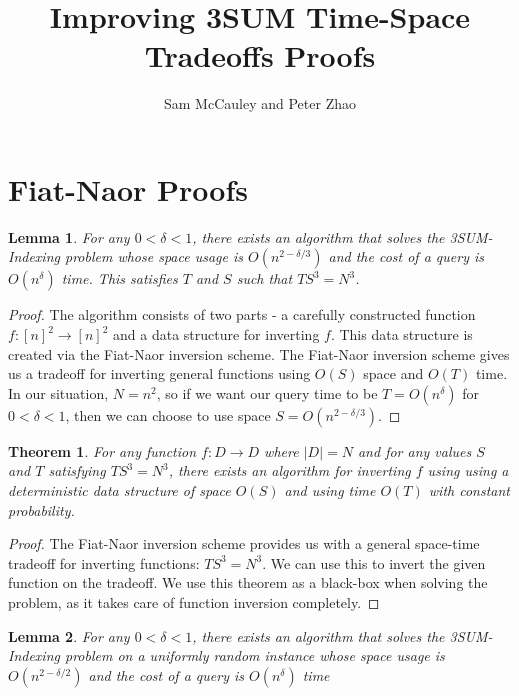 \documentclass{article}
\title{Improving 3SUM Time-Space Tradeoffs Proofs}
\author{Sam McCauley and Peter Zhao}
\date{}
\newtheorem{theorem}{Theorem}
\newtheorem{lemma}{Lemma}
\begin{document}
\maketitle

\section{Fiat-Naor Proofs}
\label{sec:fiat-naor}

\begin{lemma}
\label{3SUM-Indexing}
For any $0 < \delta < 1$, there exists an algorithm that solves the 3SUM-Indexing problem whose space usage is $O(n^{2 - \delta/3})$ and the cost of a query is $O(n^{\delta})$ time. This satisfies $T$ and $S$ such that $TS^3 = N^3$.
\end{lemma}

\begin{proof}
The algorithm consists of two parts - a carefully constructed function $f:[n]^2 \rightarrow [n]^2$ and a data structure for inverting $f$. This data structure is created via the Fiat-Naor inversion scheme. The Fiat-Naor inversion scheme gives us a tradeoff for inverting general functions using $O(S)$ space and $O(T)$ time. In our situation, $N=n^2$, so if we want our query time to be $T=O(n^\delta)$ for $0 < \delta < 1$, then we can choose to use space $S = O(n^{2-\delta/3})$.
\end{proof}

\begin{theorem}
\label{Fiat-Naor}
For any function $f:D \rightarrow D$ where $|D| = N$ and for any values $S$ and $T$ satisfying $TS^3 = N^3$, there exists an algorithm for inverting $f$ using using a deterministic data structure of space $O(S)$ and using time $O(T)$ with constant probability.
\end{theorem}

\begin{proof}
The Fiat-Naor inversion scheme provides us with a general space-time tradeoff for inverting functions: $TS^3 = N^3$. We can use this to invert the given function on the tradeoff. We use this theorem as a black-box when solving the problem, as it takes care of function inversion completely. 
\end{proof}

\begin{lemma}
\label{Random Instances}
For any $0 < \delta < 1$, there exists an algorithm that solves the 3SUM-Indexing problem on a uniformly random instance whose space usage is $O(n^{2 - \delta/2})$ and the cost of a query is $O(n^{\delta})$ time
\end{lemma}
\end{document}
